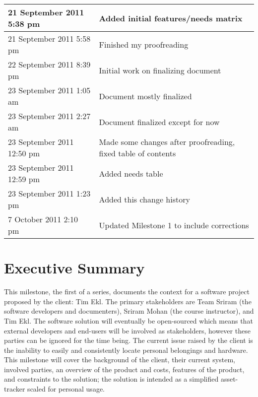 \documentclass{article}
\begin{document}
\begin{tabular}{ | p{2in} | p{4.5in} | }
\hline
21 September 2011  5:38 pm & Added initial features/needs matrix \\
\hline
21 September 2011  5:58 pm & Finished my proofreading \\
\hline
22 September 2011  8:39 pm & Initial work on finalizing document \\
\hline
23 September 2011  1:05 am & Document mostly finalized \\
\hline
23 September 2011  2:27 am & Document finalized except for now \\
\hline
23 September 2011  12:50 pm & Made some changes after proofreading, fixed table of contents \\
\hline
23 September 2011  12:59 pm & Added needs table \\
\hline
23 September 2011  1:23 pm & Added this change history \\
\hline
7 October 2011 2:10 pm & Updated Milestone 1 to include corrections\\
\hline
\end{tabular}
\clearpage
\section{Executive Summary}
This milestone, the first of a series, documents the context for a software project proposed by the client: Tim Ekl. The primary stakeholders are Team Sriram (the software developers and documenters), Sriram Mohan (the course instructor), and Tim Ekl.  The software solution will eventually be open-sourced which means that external developers and end-users will be involved as stakeholders, however these parties can be ignored for the time being. The current issue raised by the client is the inability to easily and consistently locate personal belongings and hardware. This milestone will cover the background of the client, their current system, involved parties, an overview of the product and costs, features of the product, and constraints to the solution; the solution is intended as a simplified asset-tracker scaled for personal usage.
\end{document}
